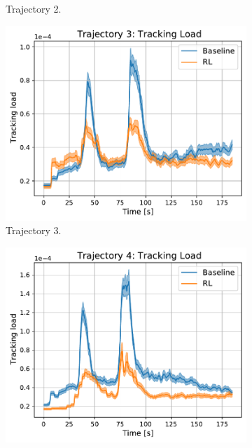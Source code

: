 \documentclass[english, 12pt, a4paper, elec, utf8, a-1b, online]{aaltothesis}
\numberwithin{equation}{section}
\begin{document}
\begin{figure}
\begin{subfigure}[b]{0.45\textwidth}
        \caption{Trajectory 2.}
        \label{fig:TL_T2}
    \end{subfigure}
    \hfill
    \begin{subfigure}[b]{0.45\textwidth}
        \centering
        \includegraphics[width=\linewidth]{figures/benchmark/Simulations/tracking_load_2.pdf}
        \caption{Trajectory 3.}
        \label{fig:TL_T3}
    \end{subfigure}
    \hfill
    \begin{subfigure}[b]{0.45\textwidth}
        \centering
        \includegraphics[width=\linewidth]{figures/benchmark/Simulations/tracking_load_3.pdf}

\end{subfigure}
\end{figure}
\end{document}
